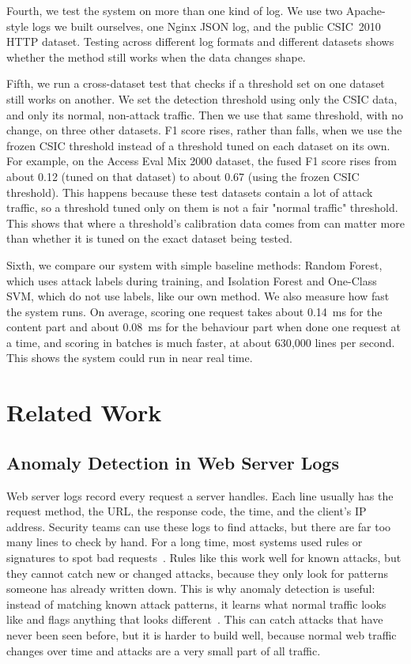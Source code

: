 \documentclass[futureinternet,article,submit,moreauthors]{Definitions/mdpi}
\begin{document}
Fourth, we test the system on more than one kind of log. We use two Apache-style logs we built ourselves, one Nginx JSON log, and the public CSIC~2010 HTTP dataset. Testing across different log formats and different datasets shows whether the method still works when the data changes shape.

Fifth, we run a cross-dataset test that checks if a threshold set on one dataset still works on another. We set the detection threshold using only the CSIC data, and only its normal, non-attack traffic. Then we use that same threshold, with no change, on three other datasets. F1 score rises, rather than falls, when we use the frozen CSIC threshold instead of a threshold tuned on each dataset on its own. For example, on the Access Eval Mix 2000 dataset, the fused F1 score rises from about 0.12 (tuned on that dataset) to about 0.67 (using the frozen CSIC threshold). This happens because these test datasets contain a lot of attack traffic, so a threshold tuned only on them is not a fair "normal traffic" threshold. This shows that where a threshold's calibration data comes from can matter more than whether it is tuned on the exact dataset being tested.

Sixth, we compare our system with simple baseline methods: Random Forest, which uses attack labels during training, and Isolation Forest and One-Class SVM, which do not use labels, like our own method. We also measure how fast the system runs. On average, scoring one request takes about 0.14~ms for the content part and about 0.08~ms for the behaviour part when done one request at a time, and scoring in batches is much faster, at about 630{,}000 lines per second. This shows the system could run in near real time.

\section{Related Work} \label{sec3}

\subsection{Anomaly Detection in Web Server Logs}

Web server logs record every request a server handles. Each line usually has the request method, the URL, the response code, the time, and the client's IP address. Security teams can use these logs to find attacks, but there are far too many lines to check by hand. For a long time, most systems used rules or signatures to spot bad requests~\cite{scarfone2007}. Rules like this work well for known attacks, but they cannot catch new or changed attacks, because they only look for patterns someone has already written down. This is why anomaly detection is useful: instead of matching known attack patterns, it learns what normal traffic looks like and flags anything that looks different~\cite{chandola2009}. This can catch attacks that have never been seen before, but it is harder to build well, because normal web traffic changes over time and attacks are a very small part of all traffic.
\end{document}
